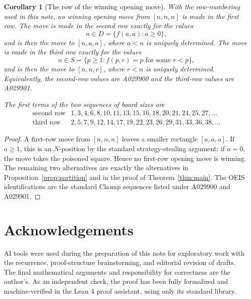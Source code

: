 \documentclass[11pt]{article}
\newtheorem{corollary}[theorem]{Corollary}
\begin{document}
\begin{corollary}[The row of the winning opening move]\label{cor:openingrows}
With the row-numbering used in this note, no winning opening move from
$[n,n,n]$ is made in the first row. The move is made in the second row exactly
for the values
\[
        n\in D=\{f(a,a):a\ge 0\},
\]
and is then the move to $[n,a,a]$, where $a<n$ is uniquely determined. The
move is made in the third row exactly for the values
\[
        n\in S=\{p\ge 1: f(p,r)=p\text{ for some }r<p\},
\]
and is then the move to $[n,n,r]$, where $r<n$ is uniquely determined.
Equivalently, the second-row values are A029900 and the third-row values are
A029901.

The first terms of the two sequences of board sizes are
\[
\begin{array}{c|l}
\text{second row} & 1,3,4,6,8,10,11,13,15,16,18,20,21,24,25,27,\ldots\\
\text{third row}  & 2,5,7,9,12,14,17,19,22,23,26,29,31,33,36,38,\ldots
\end{array}
\]
\end{corollary}

\begin{proof}
A first-row move from $[n,n,n]$ leaves a smaller rectangle $[a,a,a]$. If
$a\ge 1$, this is an $N$-position by the standard strategy-stealing argument;
if $a=0$, the move takes the poisoned square. Hence no first-row opening move
is winning. The remaining two alternatives are exactly the alternatives in
Proposition~\ref{prop:partition} and in the proof of Theorem~\ref{thm:main}.
The OEIS identifications are the standard Chomp sequences listed under A029900
and A029901.
\end{proof}

\section*{Acknowledgements}
AI tools were used during the preparation of this note for exploratory work
with the recurrence, proof-structure brainstorming, and editorial revision of
drafts. The final mathematical arguments and responsibility for correctness
are the author's. As an independent check, the proof has been fully formalized
and machine-verified in the Lean 4 proof assistant, using only its standard
library.
\end{document}
